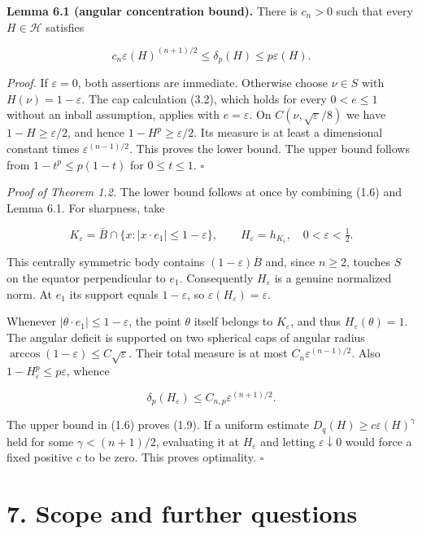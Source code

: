 \documentclass[11pt]{article}
\begin{document}
\textbf{Lemma 6.1 (angular concentration bound).} There is \(c_n>0\)
such that every \(H\in\mathcal H\) satisfies

\[
c_n\varepsilon(H)^{(n+1)/2}
\leq\delta_p(H)\leq p\varepsilon(H).
\tag{6.1}
\]

\emph{Proof.} If \(\varepsilon=0\), both assertions are immediate.
Otherwise choose \(\nu\in S\) with \(H(\nu)=1-\varepsilon\). The cap
calculation (3.2), which holds for every \(0<e\leq1\) without an inball
assumption, applies with \(e=\varepsilon\). On
\(C(\nu,\sqrt\varepsilon/8)\) we have \(1-H\geq\varepsilon/2\), and
hence \(1-H^p\geq\varepsilon/2\). Its measure is at least a dimensional
constant times \(\varepsilon^{(n-1)/2}\). This proves the lower bound.
The upper bound follows from \(1-t^p\leq p(1-t)\) for \(0\leq t\leq1\).
\(\square\)

\emph{Proof of Theorem 1.2.} The lower bound follows at once by
combining (1.6) and Lemma 6.1. For sharpness, take

\[
K_\varepsilon=
\overline B\cap\{x:|x\cdot e_1|\leq1-\varepsilon\},
\qquad H_\varepsilon=h_{K_\varepsilon},
\quad 0<\varepsilon<\tfrac12.
\tag{6.2}
\]

This centrally symmetric body contains \((1-\varepsilon)\overline B\)
and, since \(n\geq2\), touches \(S\) on the equator perpendicular to
\(e_1\). Consequently \(H_\varepsilon\) is a genuine normalized norm. At
\(e_1\) its support equals \(1-\varepsilon\), so
\(\varepsilon(H_\varepsilon)=\varepsilon\).

Whenever \(|\theta\cdot e_1|\leq1-\varepsilon\), the point \(\theta\)
itself belongs to \(K_\varepsilon\), and thus
\(H_\varepsilon(\theta)=1\). The angular deficit is supported on two
spherical caps of angular radius
\(\arccos(1-\varepsilon)\leq C\sqrt\varepsilon\). Their total measure is
at most \(C_n\varepsilon^{(n-1)/2}\). Also
\(1-H_\varepsilon^p\leq p\varepsilon\), whence

\[
\delta_p(H_\varepsilon)\leq C_{n,p}\varepsilon^{(n+1)/2}.
\tag{6.3}
\]

The upper bound in (1.6) proves (1.9). If a uniform estimate
\(D_q(H)\geq c\varepsilon(H)^\gamma\) held for some \(\gamma<(n+1)/2\),
evaluating it at \(H_\varepsilon\) and letting
\(\varepsilon\downarrow0\) would force a fixed positive \(c\) to be
zero. This proves optimality. \(\square\)

\section{7. Scope and further
questions}\label{scope-and-further-questions}
\end{document}
